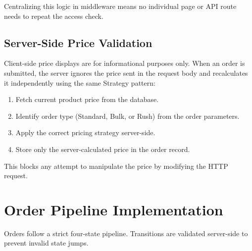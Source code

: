 \documentclass[12pt,a4paper]{report}
\begin{document}
Centralizing this logic in middleware means no individual page or API route needs to repeat the access check.

\subsection{Server-Side Price Validation}

Client-side price displays are for informational purposes only. When an order is submitted, the server ignores the price sent in the request body and recalculates it independently using the same Strategy pattern:

\begin{enumerate}
  \item Fetch current product price from the database.
  \item Identify order type (Standard, Bulk, or Rush) from the order parameters.
  \item Apply the correct pricing strategy server-side.
  \item Store only the server-calculated price in the order record.
\end{enumerate}

This blocks any attempt to manipulate the price by modifying the HTTP request.

\section{Order Pipeline Implementation}

Orders follow a strict four-state pipeline. Transitions are validated server-side to prevent invalid state jumps.

\begin{center}
\end{center}
\end{document}
